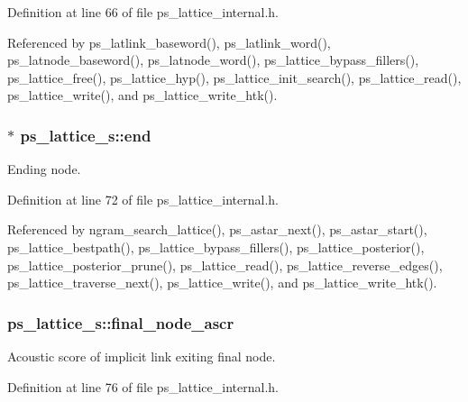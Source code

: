\-Definition at line 66 of file ps\-\_\-lattice\-\_\-internal.\-h.



\-Referenced by ps\-\_\-latlink\-\_\-baseword(), ps\-\_\-latlink\-\_\-word(), ps\-\_\-latnode\-\_\-baseword(), ps\-\_\-latnode\-\_\-word(), ps\-\_\-lattice\-\_\-bypass\-\_\-fillers(), ps\-\_\-lattice\-\_\-free(), ps\-\_\-lattice\-\_\-hyp(), ps\-\_\-lattice\-\_\-init\-\_\-search(), ps\-\_\-lattice\-\_\-read(), ps\-\_\-lattice\-\_\-write(), and ps\-\_\-lattice\-\_\-write\-\_\-htk().

\subsubsection[{end}]{$\ast$ {\bf ps\-\_\-lattice\-\_\-s\-::end}}\label{structps__lattice__s_a00f30e2689853d6bcb31c8005a69dc7b}


\-Ending node. 



\-Definition at line 72 of file ps\-\_\-lattice\-\_\-internal.\-h.



\-Referenced by ngram\-\_\-search\-\_\-lattice(), ps\-\_\-astar\-\_\-next(), ps\-\_\-astar\-\_\-start(), ps\-\_\-lattice\-\_\-bestpath(), ps\-\_\-lattice\-\_\-bypass\-\_\-fillers(), ps\-\_\-lattice\-\_\-posterior(), ps\-\_\-lattice\-\_\-posterior\-\_\-prune(), ps\-\_\-lattice\-\_\-read(), ps\-\_\-lattice\-\_\-reverse\-\_\-edges(), ps\-\_\-lattice\-\_\-traverse\-\_\-next(), ps\-\_\-lattice\-\_\-write(), and ps\-\_\-lattice\-\_\-write\-\_\-htk().

\subsubsection[{final\-\_\-node\-\_\-ascr}]{ {\bf ps\-\_\-lattice\-\_\-s\-::final\-\_\-node\-\_\-ascr}}\label{structps__lattice__s_aba113d4134c72d7405423c77bcc1247e}


\-Acoustic score of implicit link exiting final node. 



\-Definition at line 76 of file ps\-\_\-lattice\-\_\-internal.\-h.



